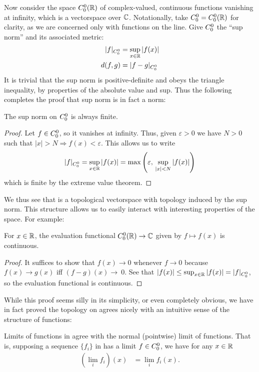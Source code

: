       Now consider the space ${C^0_0}(\mathbb{R})$ of complex-valued, continuous functions vanishing at infinity, which is a vectorspace over $\mathbb{C}$.
      Notationally, take ${C^0_0}={C^0_0}(\mathbb{R})$ for clarity, as we are concerned only with functions on the line.
      Give ${C^0_0}$ the ``sup norm'' and its associated metric:
      \begin{align*}
        |f|_{C^0_0} &= \sup_{x\in\mathbb{R}}|f(x)|\\
        d(f,g) &= |f-g|_{C^0_0}
      \end{align*}
      It is trivial that the sup norm is positive-definite and obeys the triangle inequality, by properties of the absolute value and sup.
      Thus the following completes the proof that sup norm is in fact a norm:
      \begin{claim}
        The sup norm on ${C^0_0}$ is always finite.
        \begin{proof}
          Let $f\in {C^0_0}$, so it vanishes at infinity.
          Thus, given $\varepsilon>0$ we have $N>0$ such that $|x|>N\Rightarrow f(x)<\varepsilon$.
          This allows us to write
          \begin{align*}
            |f|_{C^0_0}
            = \sup_{x\in\mathbb{R}}|f(x)|
            = \max\left(\varepsilon,\,\sup_{|x|<N}|f(x)|\right)
          \end{align*}
          which is finite by the extreme value theorem.
        \end{proof}
      \end{claim}
      We thus see that \Coo is a topological vectorspace with topology induced by the sup norm.
      This structure allows us to easily interact with interesting properties of the space.
      For example:
      \begin{claim}
        For $x\in\mathbb{R}$, the evaluation functional ${C^0_0}(\mathbb{R})\rightarrow\mathbb{C}$ given by $f\mapsto f(x)$ is continuous.
        \begin{proof}
          It suffices to show that $f(x)\rightarrow 0$ whenever $f\rightarrow 0$ because $f(x)\rightarrow g(x)$ iff $(f-g)(x)\rightarrow~0$.
          See that $|f(x)| \le \sup_{x\in\mathbb{R}} |f(x)| = |f|_{C^0_0}$, so the evaluation functional is continuous.
        \end{proof}
      \end{claim}
      While this proof seems silly in its simplicity, or even completely obvious, we have in fact proved the topology on \Coo agrees nicely with an intuitive sense of the structure of functions:
      \begin{cor}
        \label{cor:limitworks}
        Limits of functions in \Coo agree with the normal (pointwise) limit of functions.
        That is, supposing a sequence $\{f_i\}$ in \Coo has a limit $f\in{C^0_0}$, we have for any $x\in\mathbb{R}$
        \begin{align*}
          (\lim_i f_i)(x) &= \lim_i f_i(x)\text{.}
        \end{align*}
      \end{cor}

